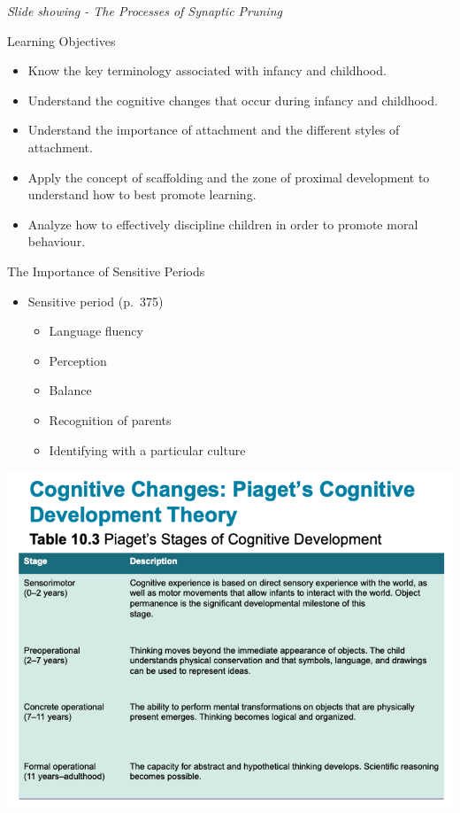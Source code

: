 \documentclass[
]{book}
\providecommand{\tightlist}{%
  \setlength{\itemsep}{0pt}\setlength{\parskip}{0pt}}
\begin{document}
\begin{reflect}
\emph{Slide showing - The Processes of Synaptic Pruning}

Learning Objectives

\begin{itemize}
\tightlist
\item
  Know the key terminology associated with infancy and childhood.\\
\item
  Understand the cognitive changes that occur during infancy and childhood.\\
\item
  Understand the importance of attachment and the different styles of attachment.\\
\item
  Apply the concept of scaffolding and the zone of proximal development to understand how to best promote learning.\\
\item
  Analyze how to effectively discipline children in order to promote moral behaviour.
\end{itemize}

The Importance of Sensitive Periods

\begin{itemize}
\tightlist
\item
  Sensitive period (p.~375)

  \begin{itemize}
  \tightlist
  \item
    Language fluency\\
  \item
    Perception\\
  \item
    Balance\\
  \item
    Recognition of parents\\
  \item
    Identifying with a particular culture
  \end{itemize}
\end{itemize}

\includegraphics{assets/unit_3/slide_23.png}


\end{reflect}
\end{document}
